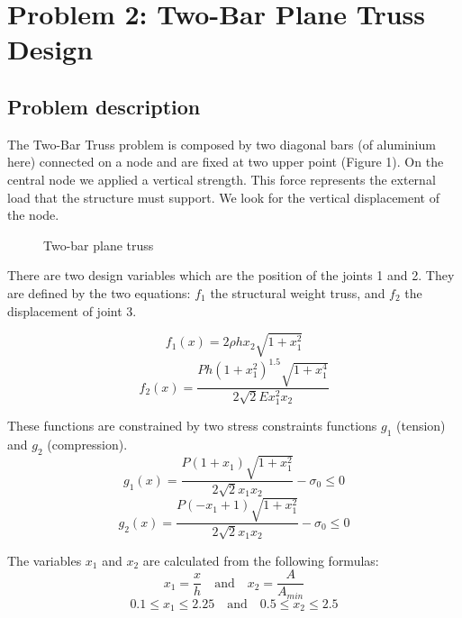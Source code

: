\section{Problem 2: Two-Bar Plane Truss Design}

\subsection{Problem description}

The Two-Bar Truss problem is composed by two diagonal bars (of aluminium here) connected on a node and are fixed at two upper point (Figure 1). On the central node we applied a vertical strength. This force represents the external load that the structure must support. We look for the vertical displacement of the node.
 
\begin{figure}[h!]
    \centering
    \caption{Two-bar plane truss} 
\end{figure}

There are two design variables which are the position of the joints 1 and 2. They are defined by the two equations: $f_1$ the structural weight truss, and $f_2$ the displacement of joint 3.

\begin{equation}
f_1(x)=2\rho hx_2\sqrt{1+x_1^2}
\end{equation}
\begin{equation}
f_2(x)=\frac{Ph(1+x_1^2)^{1.5}\sqrt{1+x_1^4}}{2\sqrt{2}Ex_1^2x_2}
\end{equation}

These functions are constrained by two stress constraints functions $g_1$ (tension) and $g_2$ (compression).
\begin{equation}
g_1(x)=\frac{P(1+x_1)\sqrt{1+x_1^2}}{2\sqrt{2}x_1x_2}-\sigma_0\le0
\end{equation}
\begin{equation}
g_2(x)=\frac{P(-x_1+1)\sqrt{1+x_1^2}}{2\sqrt{2}x_1x_2}-\sigma_0\le0
\end{equation}

The variables $x_1$ and $x_2$ are calculated from the following formulas:
\begin{equation}
x_1=\frac{x}{h} \quad \text{and} \quad x_2=\frac{A}{A_{min}}
\end{equation}
\begin{equation}
0.1\le x_1\le2.25 \quad \text{and} \quad 0.5\le x_2\le2.5
\end{equation}

